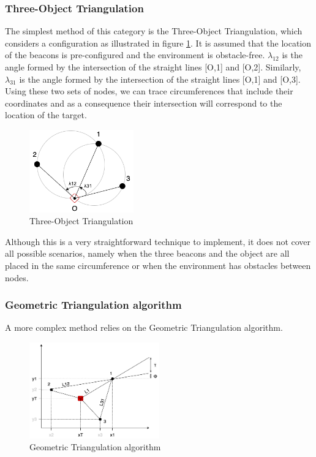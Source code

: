 \subsubsection{Three-Object Triangulation}
The simplest method of this category is the Three-Object Triangulation, which considers a configuration as illustrated in figure \ref{fig:tri1}. It is assumed that the location of the beacons is pre-configured and the environment is obstacle-free. $\lambda_{12}$ is the angle formed by the intersection of the straight lines [O,1] and [O,2]. Similarly, $\lambda_{31}$ is the angle formed by the intersection of the straight lines [O,1] and [O,3]. Using these two sets of nodes, we can trace circumferences that include their coordinates and as a consequence their intersection will correspond to the location of the target.

\begin{figure}[!htbp]
	\centering
	\includegraphics[width=0.4\textwidth]{figures/triangulation}
	\caption{Three-Object Triangulation}
	\label{fig:tri1}
\end{figure}

Although this is a very straightforward technique to implement, it does not cover all possible scenarios, namely when the three beacons and the object are all placed in the same circumference or when the environment has obstacles between nodes.

\subsubsection{Geometric Triangulation algorithm}

A more complex method relies on the Geometric Triangulation algorithm. 

\begin{figure}[!htbp]
	\centering
	\includegraphics[width=0.5\textwidth]{figures/geotriang}
	\caption{Geometric Triangulation algorithm}
	\label{fig:tri2}
\end{figure}


